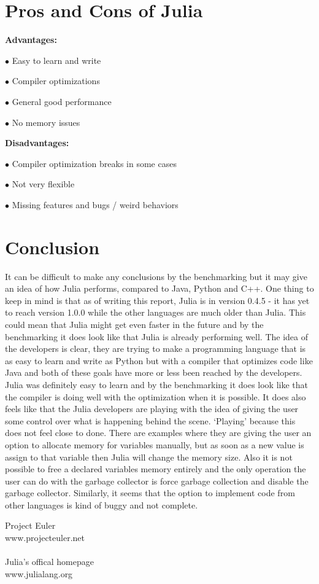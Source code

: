 \documentclass[landscape, a0]{sciposter}
\begin{document}
\begin{multicols}{3}
\section{Pros and Cons of Julia}
\textbf{Advantages:}
\begin{list}{}{}
	\item[$\bullet$] Easy to learn and write
	\item[$\bullet$] Compiler optimizations
	\item[$\bullet$] General good performance
	\item[$\bullet$] No memory issues
\end{list}
\textbf{Disadvantages:}
\begin{list}{}{}
	\item[$\bullet$] Compiler optimization breaks in some cases
	\item[$\bullet$] Not very flexible
	\item[$\bullet$] Missing features and bugs / weird behaviors
\end{list}

\section{Conclusion}
It can be difficult to make any conclusions by the benchmarking but it may give an idea of how Julia performs, compared to Java, Python and C++. One thing to keep in mind is that as of writing this report, Julia is in version 0.4.5 - it has yet to reach version 1.0.0 while the other languages are much older than Julia. This could mean that Julia might get even faster in the future and by the benchmarking it does look like that Julia is already performing well. The idea of the developers is clear, they are trying to make a programming language that is as easy to learn and write as Python but with a compiler that optimizes code like Java and both of these goals have more or less been reached by the developers. Julia was definitely easy to learn and by the benchmarking it does look like that the compiler is doing well with the optimization when it is possible. It does also feels like that the Julia developers are playing with the idea of giving the user some control over what is happening behind the scene. ‘Playing’ because this does not feel close to done. There are examples where they are giving the user an option to allocate memory for variables manually, but as soon as a new value is assign to that variable then Julia will change the memory size. Also it is not possible to free a declared variables memory entirely and the only operation the user can do with the garbage collector is force garbage collection and disable the garbage collector. Similarly, it seems that the option to implement code from other languages is kind of buggy and not complete. 

\begin{thebibliography}{m}

Project Euler\\
www.projecteuler.net\\
\\
Julia's offical homepage\\
www.julialang.org


\end{thebibliography}


\end{multicols}
\end{document}
